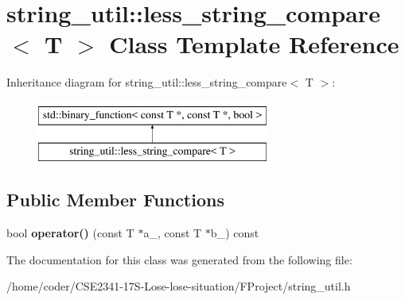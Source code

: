 \section{string\+\_\+util\+:\+:less\+\_\+string\+\_\+compare$<$ T $>$ Class Template Reference}
\label{classstring__util_1_1less__string__compare}
Inheritance diagram for string\+\_\+util\+:\+:less\+\_\+string\+\_\+compare$<$ T $>$\+:\begin{figure}[H]
\begin{center}
\leavevmode
\includegraphics[height=2.000000cm]{classstring__util_1_1less__string__compare}
\end{center}
\end{figure}
\subsection*{Public Member Functions}
\begin{DoxyCompactItemize}
\item 
bool {\bfseries operator()} (const T $\ast$a\+\_\+, const T $\ast$b\+\_\+) const \label{classstring__util_1_1less__string__compare_aa97df82edd8f7e33e5715acf71759337}

\end{DoxyCompactItemize}


The documentation for this class was generated from the following file\+:\begin{DoxyCompactItemize}
\item 
/home/coder/\+C\+S\+E2341-\/17\+S-\/\+Lose-\/lose-\/situation/\+F\+Project/string\+\_\+util.\+h\end{DoxyCompactItemize}
